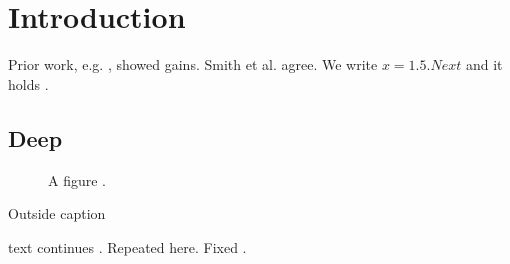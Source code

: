 \documentclass{article}
\begin{document}
\section{Introduction}
Prior work, e.g. \citep[see][p.~3]{alpha, beta}, showed gains. Smith et al. \cite{gamma} agree.
We write $x = 1.5. Next$ and it holds \citet*{alpha}.

\subsection{Deep}

\begin{figure}
\caption{A figure \cite{figkey}.}
\end{figure}
Outside caption \caption{Stray \cite{capkey}.} text continues \cite{delta}.
Repeated \cite{alpha,alpha} here. Fixed \nocite{nokey}.

\end{document}
